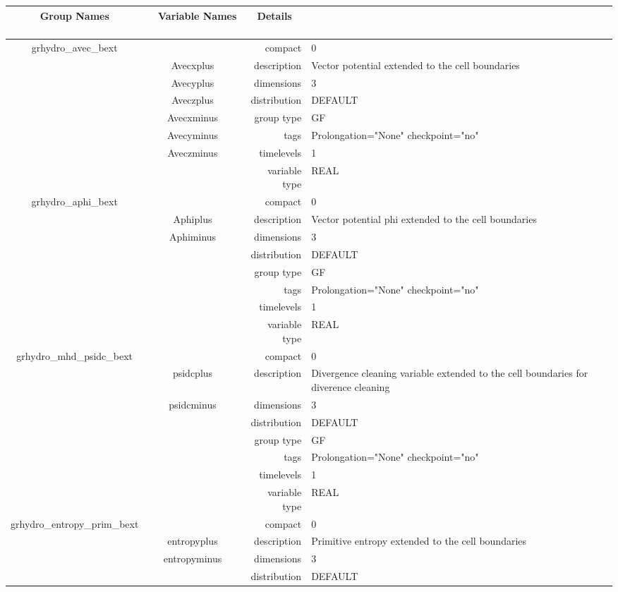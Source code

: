 \documentclass{article}
\begin{document}
\begin{tabular*}{150mm}{|c|c@{\extracolsep{\fill}}|rl|} \hline 
~ {\bf Group Names} ~ & ~ {\bf Variable Names} ~  &{\bf Details} ~ & ~ \\ 
\hline 
grhydro\_avec\_bext &  & compact & 0 \\ 
 & Avecxplus & description & Vector potential extended to the cell boundaries \\ 
 & Avecyplus & dimensions & 3 \\ 
 & Aveczplus & distribution & DEFAULT \\ 
 & Avecxminus & group type & GF \\ 
 & Avecyminus & tags & Prolongation="None" checkpoint="no" \\ 
 & Aveczminus & timelevels & 1 \\ 
 &  & variable type & REAL \\ 
\hline 
grhydro\_aphi\_bext &  & compact & 0 \\ 
 & Aphiplus & description & Vector potential phi extended to the cell boundaries \\ 
 & Aphiminus & dimensions & 3 \\ 
 &  & distribution & DEFAULT \\ 
 &  & group type & GF \\ 
 &  & tags & Prolongation="None" checkpoint="no" \\ 
 &  & timelevels & 1 \\ 
 &  & variable type & REAL \\ 
\hline 
grhydro\_mhd\_psidc\_bext &  & compact & 0 \\ 
 & psidcplus & description & Divergence cleaning variable extended to the cell boundaries for diverence cleaning \\ 
 & psidcminus & dimensions & 3 \\ 
 &  & distribution & DEFAULT \\ 
 &  & group type & GF \\ 
 &  & tags & Prolongation="None" checkpoint="no" \\ 
 &  & timelevels & 1 \\ 
 &  & variable type & REAL \\ 
\hline 
grhydro\_entropy\_prim\_bext &  & compact & 0 \\ 
 & entropyplus & description & Primitive entropy extended to the cell boundaries \\ 
 & entropyminus & dimensions & 3 \\ 
 &  & distribution & DEFAULT \\ 

\end{tabular*}
\end{document}
